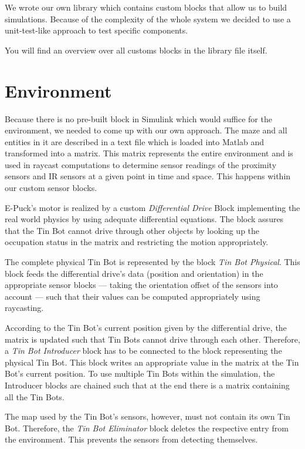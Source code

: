 \documentclass[a4paper,parskip,headheight=38pt]{scrartcl} %
\begin{document}
We wrote our own library which contains custom blocks that allow us to build simulations. Because of the complexity of the whole system we decided to use a unit-test-like approach to test specific components.

You will find an overview over all customs blocks in the library file itself.


\section{Environment}
Because there is no pre-built block in Simulink which would suffice for the environment, we needed to come up with our own approach. The maze and all entities in it are described in a text file which is loaded into Matlab and transformed into a matrix. This matrix represents the entire environment and is used in raycast computations to determine sensor readings of the proximity sensors and IR sensors at a given point in time and space. This happens within our custom sensor blocks.

E-Puck's motor is realized by a custom \emph{Differential Drive} Block implementing the real world physics by using adequate differential equations. The block assures that the Tin Bot cannot drive through other objects by looking up the occupation status in the matrix and restricting the motion appropriately.

The complete physical Tin Bot is represented by the block \emph{Tin Bot Physical}. This block feeds the differential drive's data (position and orientation) in the appropriate sensor blocks — taking the orientation offset of the sensors into account — such that their values can be computed appropriately using raycasting.

According to the Tin Bot's current position given by the differential drive, the matrix is updated such that Tin Bots cannot drive through each other. Therefore, a \emph{Tin Bot Introducer} block has to be connected to the block representing the physical Tin Bot. This block writes an appropriate value in the matrix at the Tin Bot's current position. To use multiple Tin Bots within the simulation, the Introducer blocks are chained such that at the end there is a matrix containing all the Tin Bots.

The map used by the Tin Bot's sensors, however, must not contain its own Tin Bot. Therefore, the \emph{Tin Bot Eliminator} block deletes the respective entry from the environment. This prevents the sensors from detecting themselves.
\end{document}
